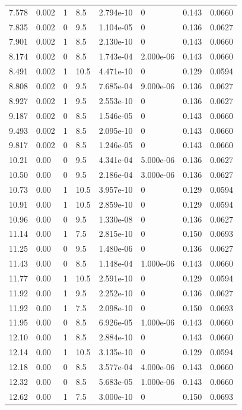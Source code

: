 \documentclass[preview]{standalone}
\begin{document}
{{\begin{tabular}{L{1.2cm}C{1.2cm} C{0.3cm}C{0.5cm} C{1.4cm}C{1.4cm} C{1.4cm}C{1.4cm}}
  7.578  &  0.002  & 1     & 8.5 &  2.794e-10  & 0  & 0.143 &  0.0660   \\ 
  7.835  &  0.002  & 0     & 9.5 &  1.104e-05  & 0  & 0.136 &  0.0627   \\ 
  7.901  &  0.002  & 1     & 8.5 &  2.130e-10  & 0  & 0.143 &  0.0660   \\ 
  8.174  &  0.002  & 0     & 8.5 &  1.743e-04  & 2.000e-06  & 0.143 &  0.0660   \\ 
  8.491  &  0.002  & 1     & 10.5 &  4.471e-10  & 0  & 0.129 &  0.0594   \\ 
  8.808  &  0.002  & 0     & 9.5 &  7.685e-04  & 9.000e-06  & 0.136 &  0.0627   \\ 
  8.927  &  0.002  & 1     & 9.5 &  2.553e-10  & 0  & 0.136 &  0.0627   \\ 
  9.187  &  0.002  & 0     & 8.5 &  1.546e-05  & 0  & 0.143 &  0.0660   \\ 
  9.493  &  0.002  & 1     & 8.5 &  2.095e-10  & 0  & 0.143 &  0.0660   \\ 
  9.817  &  0.002  & 0     & 8.5 &  1.246e-05  & 0  & 0.143 &  0.0660   \\ 
  10.21  &  0.00  & 0     & 9.5 &  4.341e-04  & 5.000e-06  & 0.136 &  0.0627   \\ 
  10.50  &  0.00  & 0     & 9.5 &  2.186e-04  & 3.000e-06  & 0.136 &  0.0627   \\ 
  10.73  &  0.00  & 1     & 10.5 &  3.957e-10  & 0  & 0.129 &  0.0594   \\ 
  10.91  &  0.00  & 1     & 10.5 &  2.859e-10  & 0  & 0.129 &  0.0594   \\ 
  10.96  &  0.00  & 0     & 9.5 &  1.330e-08  & 0  & 0.136 &  0.0627   \\ 
  11.14  &  0.00  & 1     & 7.5 &  2.815e-10  & 0  & 0.150 &  0.0693   \\ 
  11.25  &  0.00  & 0     & 9.5 &  1.480e-06  & 0  & 0.136 &  0.0627   \\ 
  11.43  &  0.00  & 0     & 8.5 &  1.148e-04  & 1.000e-06  & 0.143 &  0.0660   \\ 
  11.77  &  0.00  & 1     & 10.5 &  2.591e-10  & 0  & 0.129 &  0.0594   \\ 
  11.92  &  0.00  & 1     & 9.5 &  2.252e-10  & 0  & 0.136 &  0.0627   \\ 
  11.92  &  0.00  & 1     & 7.5 &  2.098e-10  & 0  & 0.150 &  0.0693   \\ 
  11.95  &  0.00  & 0     & 8.5 &  6.926e-05  & 1.000e-06  & 0.143 &  0.0660   \\ 
  12.10  &  0.00  & 1     & 8.5 &  2.884e-10  & 0  & 0.143 &  0.0660   \\ 
  12.14  &  0.00  & 1     & 10.5 &  3.135e-10  & 0  & 0.129 &  0.0594   \\ 
  12.18  &  0.00  & 0     & 8.5 &  3.577e-04  & 4.000e-06  & 0.143 &  0.0660   \\ 
  12.32  &  0.00  & 0     & 8.5 &  5.683e-05  & 1.000e-06  & 0.143 &  0.0660   \\ 
  12.62  &  0.00  & 1     & 7.5 &  3.000e-10  & 0  & 0.150 &  0.0693   \\ 
\hline 
\end{tabular} 

}}
\end{document}
